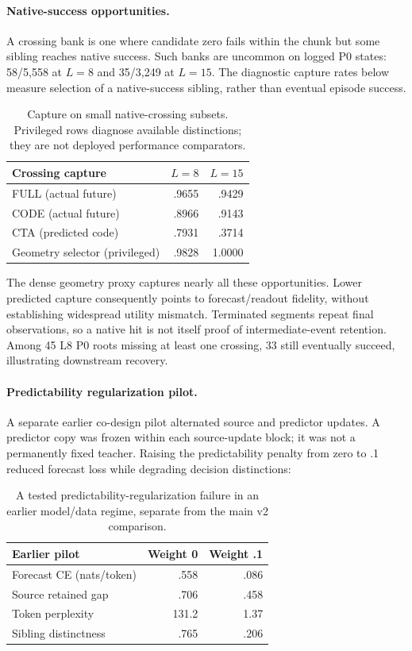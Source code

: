 \documentclass[10pt,twocolumn,letterpaper]{article}
\begin{document}
\paragraph{Native-success opportunities.}
A crossing bank is one where candidate zero fails within the chunk but some sibling reaches native success. Such banks are uncommon on logged P0 states: 58/5,558 at $L=8$ and 35/3,249 at $L=15$. The diagnostic capture rates below measure selection of a native-success sibling, rather than eventual episode success.

\begin{table}[t]
\centering\small
\begin{tabular}{lrr}
\toprule
Crossing capture & $L=8$ & $L=15$ \\
\midrule
FULL (actual future) & .9655 & .9429 \\
CODE (actual future) & .8966 & .9143 \\
CTA (predicted code) & .7931 & .3714 \\
Geometry selector (privileged) & .9828 & 1.0000 \\
\bottomrule
\end{tabular}
\caption{Capture on small native-crossing subsets. Privileged rows diagnose available distinctions; they are not deployed performance comparators.}
\end{table}

The dense geometry proxy captures nearly all these opportunities. Lower predicted capture consequently points to forecast/readout fidelity, without establishing widespread utility mismatch. Terminated segments repeat final observations, so a native hit is not itself proof of intermediate-event retention. Among 45 L8 P0 roots missing at least one crossing, 33 still eventually succeed, illustrating downstream recovery.

\paragraph{Predictability regularization pilot.}
A separate earlier co-design pilot alternated source and predictor updates. A predictor copy was frozen within each source-update block; it was not a permanently fixed teacher. Raising the predictability penalty from zero to .1 reduced forecast loss while degrading decision distinctions:

\begin{table}[t]
\centering\small
\begin{tabular}{lrr}
\toprule
Earlier pilot & Weight 0 & Weight .1 \\
\midrule
Forecast CE (nats/token) & .558 & .086 \\
Source retained gap & .706 & .458 \\
Token perplexity & 131.2 & 1.37 \\
Sibling distinctness & .765 & .206 \\
\bottomrule
\end{tabular}
\caption{A tested predictability-regularization failure in an earlier model/data regime, separate from the main v2 comparison.}
\end{table}
\end{document}
